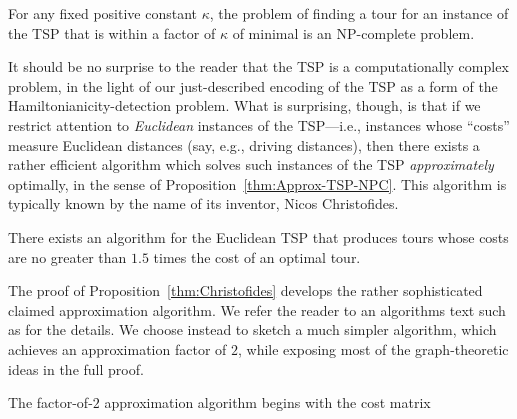 \begin{prop}
\label{thm:Approx-TSP-NPC}
For any fixed positive constant $\kappa$, the problem of finding a tour for an instance of the TSP that is within a factor of $\kappa$ of minimal is an {\sf NP}-complete problem.
\end{prop}


It should be no surprise to the reader that the TSP is a computationally complex problem, in the light of our just-described encoding of the TSP as a form of the Hamiltonianicity-detection problem.  What is surprising, though, is that if we restrict attention to {\em Euclidean} instances of the TSP---i.e., instances whose ``costs'' measure Euclidean distances (say, e.g., driving distances), then there exists a rather efficient algorithm which solves such instances of the TSP {\em approximately} optimally, in the sense of Proposition~\ref{thm:Approx-TSP-NPC}.  %
This algorithm is typically known by the name of its inventor, Nicos Christofides.

\begin{prop}
\label{thm:Christofides}
There exists an algorithm for the Euclidean TSP that produces tours whose costs are no greater than $1.5$ times the cost of an optimal tour.
\end{prop}

The proof of Proposition~\ref{thm:Christofides} develops the rather sophisticated claimed approximation algorithm.  We refer the reader to an algorithms text such as \cite{CLRS} for the details.  We choose instead to sketch a much simpler algorithm, which achieves an approximation factor of $2$, while exposing most of the graph-theoretic ideas in the full proof.   

The factor-of-$2$ approximation algorithm begins with the cost matrix

